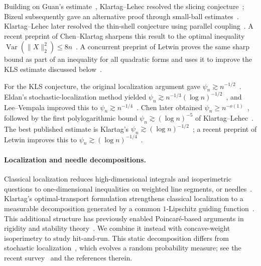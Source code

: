 \documentclass[11pt]{article}
\theoremstyle{definition}
\theoremstyle{remark}
\begin{document}
Building on Guan's estimate~\cite{GuanSlicing}, Klartag--Lehec resolved the slicing conjecture~\cite{KlartagLehecSlicing}; Bizeul subsequently gave an alternative proof through small-ball estimates~\cite{BizeulSlicing}. Klartag--Lehec later resolved the thin-shell conjecture using parallel coupling~\cite{KlartagLehecThinShell}.  A recent preprint of Chen--Klartag sharpens this result to the optimal inequality $\operatorname{Var}(\|X\|_2^2)\le8n$~\cite{ChenKlartagThinShell}. A concurrent preprint of Letwin proves the same sharp bound as part of an inequality for all quadratic forms and uses it to improve the KLS estimate discussed below~\cite{LetwinKLS}. 

For the KLS conjecture, the original localization argument gave $\psi_n\gtrsim n^{-1/2}$~\cite{KLS95}.  Eldan's stochastic-localization method yielded $\psi_n\gtrsim n^{-1/3}(\log n)^{-1/2}$~\cite{EldanSL}, and Lee--Vempala
improved this to $\psi_n\gtrsim n^{-1/4}$~\cite{LeeVempalaKLS}.  Chen later
obtained $\psi_n\geq n^{-o(1)}$~\cite{ChenKLS}, followed by the first
polylogarithmic bound $\psi_n\gtrsim (\log n)^{-5}$ of Klartag--Lehec~\cite{KlartagLehecKLS}.  The best published estimate is Klartag's $\psi_n\gtrsim(\log n)^{-1/2}$~\cite{KlartagKLS}; a recent preprint of Letwin improves this to $\psi_n\gtrsim(\log n)^{-1/4}$~\cite{LetwinKLS}.  

\paragraph{Localization and needle decompositions.}
Classical localization reduces high-dimensional integrals and isoperimetric questions to one-dimensional inequalities on weighted line segments, or needles~\cite{LS90,LS,KLS95}.  Klartag's optimal-transport formulation strengthens classical localization to a measurable decomposition generated by a common \(1\)-Lipschitz guiding function~\cite{KlartagNeedles}.  This additional structure has previously enabled Poincar\'e-based arguments in rigidity and stability theory~\cite{MaiRigidity,MaiOhta,BertrandFathi}.  We combine it instead with concave-weight isoperimetry to study hit-and-run.  This static decomposition differs from stochastic localization~\cite{EldanSL}, which evolves a random probability measure; see the recent survey~\cite{ShiTianZhangSL} and the references therein.
\end{document}
